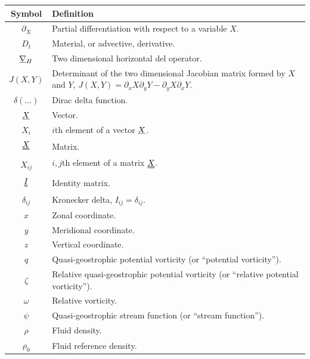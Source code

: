 \documentclass[a4paper]{book}
\begin{document}
\setlength{\extrarowheight}{3pt}
\begin{center}
\begin{longtable}{ | c | p{} | }
  \hline
  Symbol               & Definition \\
  \hline
  \endhead
  \hline
  \endfoot
  $\partial_X$         & Partial differentiation with respect to a variable
                         $X$. \\
  $D_t$                & Material, or advective, derivative. \\
  $\uline{\nabla}_H$   & Two dimensional horizontal del operator. \\
  $J(X, Y)$            & Determinant of the two dimensional Jacobian matrix
                         formed by $X$ and $Y$, $J(X, Y) = \partial_x X
                         \partial_y Y - \partial_y X \partial_x Y$. \\
  $\delta \left( \ldots \right)$  & Dirac delta function. \\
  $\uline{X}$          & Vector. \\
  $X_i$                & $i$th element of a vector $\uline{X}$. \\
  $\uuline{X}$         & Matrix. \\
  $X_{ij}$                & $i,j$th element of a matrix $\uuline{X}$. \\
  $\uuline{I}$         & Identity matrix. \\
  $\delta_{ij}$        & Kronecker delta, $I_{ij} = \delta_{ij}$. \\
  \hline
  $x$                  & Zonal coordinate. \\
  $y$                  & Meridional coordinate. \\
  $z$                  & Vertical coordinate. \\
  $q$                  & Quasi-geostrophic potential vorticity (or ``potential
                         vorticity''). \\
  $\zeta$              & Relative quasi-geostrophic potential vorticity (or
                        ``relative potential vorticity''). \\
  $\omega$             & Relative vorticity. \\
  $\psi$               & Quasi-geostrophic stream function (or ``stream
                         function''). \\
  $\rho$               & Fluid density. \\
  $\rho_0$             & Fluid reference density. \\

\end{longtable}
\end{center}
\end{document}
